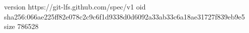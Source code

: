 version https://git-lfs.github.com/spec/v1
oid sha256:066ae225ff82e078c2c9c6f1d9338d0d6092a33ab33c6a18ae31727f839eb9e5
size 786528
